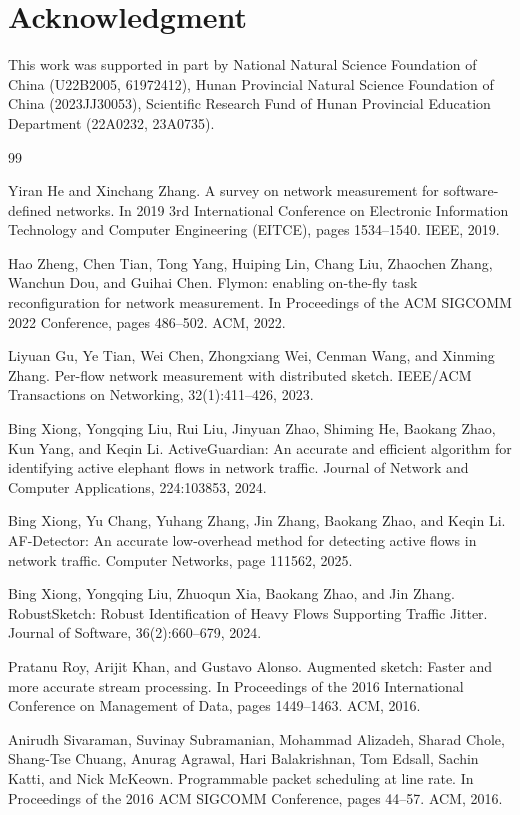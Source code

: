 \documentclass[preprint,12pt]{elsarticle}
\begin{document}
\section*{Acknowledgment}
This work was supported in part by National Natural Science Foundation of China (U22B2005, 61972412), Hunan Provincial Natural Science Foundation of China (2023JJ30053), Scientific Research Fund of Hunan Provincial Education Department (22A0232, 23A0735).

\begingroup
\sloppy
\begin{thebibliography}{99}

Yiran He and Xinchang Zhang. A survey on network measurement for software-defined networks. In 2019 3rd International Conference on Electronic Information Technology and Computer Engineering (EITCE), pages 1534--1540. IEEE, 2019.

Hao Zheng, Chen Tian, Tong Yang, Huiping Lin, Chang Liu, Zhaochen Zhang, Wanchun Dou, and Guihai Chen. Flymon: enabling on-the-fly task reconfiguration for network measurement. In Proceedings of the ACM SIGCOMM 2022 Conference, pages 486--502. ACM, 2022.

Liyuan Gu, Ye Tian, Wei Chen, Zhongxiang Wei, Cenman Wang, and Xinming Zhang. Per-flow network measurement with distributed sketch. IEEE/ACM Transactions on Networking, 32(1):411--426, 2023.

Bing Xiong, Yongqing Liu, Rui Liu, Jinyuan Zhao, Shiming He, Baokang Zhao, Kun Yang, and Keqin Li. ActiveGuardian: An accurate and efficient algorithm for identifying active elephant flows in network traffic. Journal of Network and Computer Applications, 224:103853, 2024.

Bing Xiong, Yu Chang, Yuhang Zhang, Jin Zhang, Baokang Zhao, and Keqin Li. AF-Detector: An accurate low-overhead method for detecting active flows in network traffic. Computer Networks, page 111562, 2025.

Bing Xiong, Yongqing Liu, Zhuoqun Xia, Baokang Zhao, and Jin Zhang. RobustSketch: Robust Identification of Heavy Flows Supporting Traffic Jitter. Journal of Software, 36(2):660--679, 2024.

Pratanu Roy, Arijit Khan, and Gustavo Alonso. Augmented sketch: Faster and more accurate stream processing. In Proceedings of the 2016 International Conference on Management of Data, pages 1449--1463. ACM, 2016.

Anirudh Sivaraman, Suvinay Subramanian, Mohammad Alizadeh, Sharad Chole, Shang-Tse Chuang, Anurag Agrawal, Hari Balakrishnan, Tom Edsall, Sachin Katti, and Nick McKeown. Programmable packet scheduling at line rate. In Proceedings of the 2016 ACM SIGCOMM Conference, pages 44--57. ACM, 2016.


\end{thebibliography}
\end{document}

